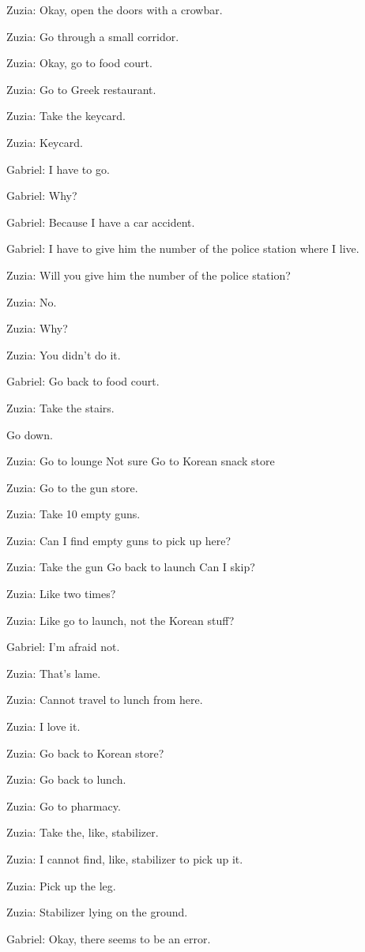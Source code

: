 Zuzia: Okay, open the doors with a crowbar.

Zuzia: Go through a small corridor.

Zuzia: Okay, go to food court.

Zuzia: Go to Greek restaurant.

Zuzia: Take the keycard.

Zuzia: Keycard.

Gabriel: I have to go.

Gabriel: Why?

Gabriel: Because I have a car accident.

Gabriel: I have to give him the number of the police station where I live.

Zuzia: Will you give him the number of the police station?

Zuzia: No.

Zuzia: Why?

Zuzia: You didn't do it.

Gabriel: Go back to food court.

Zuzia: Take the stairs.

Go down.

Zuzia: Go to lounge Not sure Go to Korean snack store

Zuzia: Go to the gun store.

Zuzia: Take 10 empty guns.

Zuzia: Can I find empty guns to pick up here?

Zuzia: Take the gun Go back to launch Can I skip?

Zuzia: Like two times?

Zuzia: Like go to launch, not the Korean stuff?

Gabriel: I'm afraid not.

Zuzia: That's lame.

Zuzia: Cannot travel to lunch from here.

Zuzia: I love it.

Zuzia: Go back to Korean store?

Zuzia: Go back to lunch.

Zuzia: Go to pharmacy.

Zuzia: Take the, like, stabilizer.

Zuzia: I cannot find, like, stabilizer to pick up it.

Zuzia: Pick up the leg.

Zuzia: Stabilizer lying on the ground.

Gabriel: Okay, there seems to be an error.

